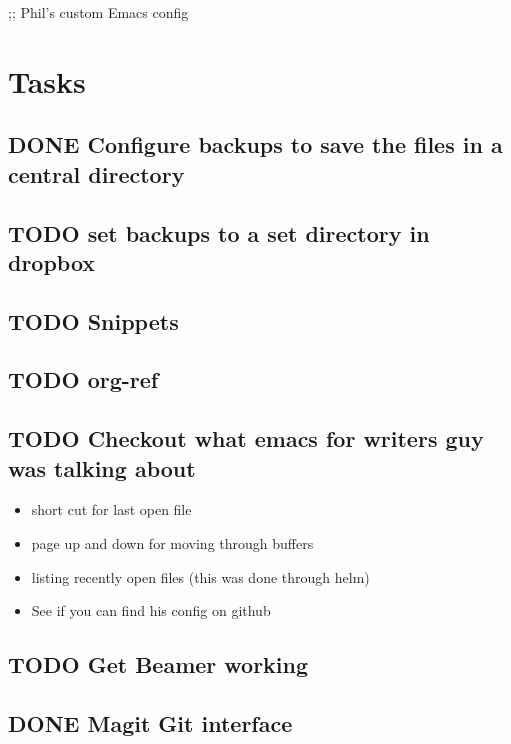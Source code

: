 \documentclass[11pt]{article}
\author{Phil McCredden}
\date{\today}
\title{}
\begin{document}
\tableofcontents

;; Phil's custom Emacs config

\section{Tasks}
\label{sec:orgd9b47c9}
\subsection{{\bfseries\sffamily DONE} Configure backups to save the files in a central directory}
\label{sec:org22ee5b8}
\subsection{{\bfseries\sffamily TODO} set backups to a set directory in dropbox}
\label{sec:orgaf495ce}
\subsection{{\bfseries\sffamily TODO} Snippets}
\label{sec:orgc255f00}

\subsection{{\bfseries\sffamily TODO} org-ref}
\label{sec:org0d4b7bc}

\subsection{{\bfseries\sffamily TODO} Checkout what emacs for writers guy was talking about}
\label{sec:orgfa18f81}
\begin{itemize}
\item short cut for last open file
\item page up and down for moving through buffers
\item listing recently open files (this was done through helm)
\item See if you can find his config on github
\end{itemize}

\subsection{{\bfseries\sffamily TODO} Get Beamer working}
\label{sec:org982a9db}
\subsection{{\bfseries\sffamily DONE} Magit Git interface}
\label{sec:org959001f}
\end{document}
